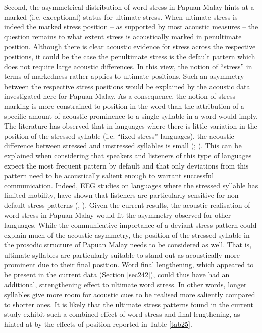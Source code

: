 Second, the asymmetrical distribution of word stress in Papuan Malay hints at a marked (i.e. exceptional) status for ultimate stress. When ultimate stress is indeed the marked stress position – as supported by most acoustic measures – the question remains to what extent stress is acoustically marked in penultimate position. Although there is clear acoustic evidence for stress across the respective positions, it could be the case the penultimate stress is the default pattern which does not require large acoustic differences. In this view, the notion of ``stress'' in terms of markedness rather applies to ultimate positions. Such an asymmetry between the respective stress positions would be explained by the acoustic data investigated here for Papuan Malay. As a consequence, the notion of stress marking is more constrained to position in the word than the attribution of a specific amount of acoustic prominence to a single syllable in a word would imply. The literature has observed that in languages where there is little variation in the position of the stressed syllable (i.e. ``fixed stress'' languages), the acoustic difference between stressed and unstressed syllables is small (\citealt{cutler_lexical_2005}; \citealt{dogil_phonetic_1999}). This can be explained when considering that speakers and listeners of this type of languages expect the most frequent pattern by default and that only deviations from this pattern need to be acoustically salient enough to warrant successful communication. Indeed, EEG studies on languages where the stressed syllable has limited mobility, have shown that listeners are particularly sensitive for non-default stress patterns (\citealt{domahs_stress_2012}, \citealt{domahs_processing_2013}). Given the current results, the acoustic realisation of word stress in Papuan Malay would fit the asymmetry observed for other languages. While the communicative importance of a deviant stress pattern could explain much of the acoustic asymmetry, the position of the stressed syllable in the prosodic structure of Papuan Malay needs to be considered as well. That is, ultimate syllables are particularly suitable to stand out as acoustically more prominent due to their final position. Word final lengthening, which appeared to be present in the current data (Section \ref{sec242}), could thus have had an additional, strengthening effect to ultimate word stress. In other words, longer syllables give more room for acoustic cues to be realised more saliently compared to shorter ones. It is likely that the ultimate stress patterns found in the current study exhibit such a combined effect of word stress and final lengthening, as hinted at by the effects of position reported in Table \ref{tab25}.\par

